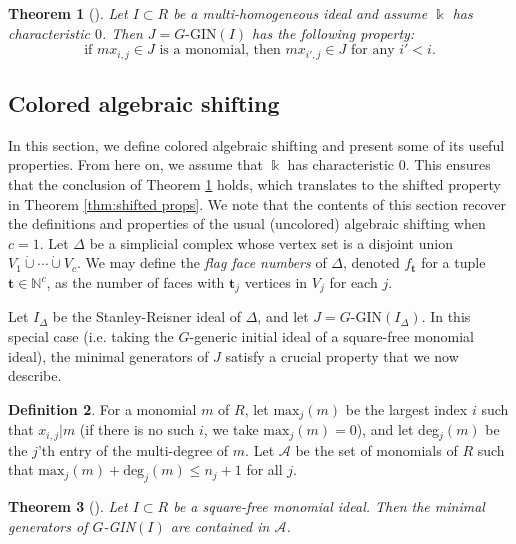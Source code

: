 \documentclass[a4paper, 10pt, reqno, english, ones]{amsart}  %
\newtheorem{theorem}{Theorem}[section]
\theoremstyle{definition}
\newtheorem{definition}[theorem]{Definition}
\theoremstyle{remark}
\begin{document}
\begin{theorem}[\cite{Babson2004Face}]\label{thm:GIN-ColorStronglyStable}
    Let $I\subset R$ be a multi-homogeneous ideal and assume $\Bbbk$ has characteristic $0$. Then $J=\textrm{$G$-GIN}(I)$ has the following property:
    \begin{equation}\label{eq:ColorStable}
    \textrm{if $mx_{i,j}\in J$ is a monomial, then $mx_{i',j}\in J$ for any $i'<i$.}
    \end{equation}
\end{theorem}

\subsection{Colored algebraic shifting}\label{sec:Alg Shifting}

In this section, we define colored algebraic shifting and present some of its useful properties. From here on, we assume that $\Bbbk$ has characteristic $0$. This ensures that the conclusion of Theorem \ref{thm:GIN-ColorStronglyStable} holds, which translates to the shifted property in Theorem \ref{thm:shifted props}. We note that the contents of this section recover the definitions and properties of the usual (uncolored) algebraic shifting when $c=1$. Let $\Delta$ be a simplicial complex whose vertex set is a disjoint union $V_1 \dot{\cup} \cdots \dot{\cup} V_c$. We may define the \textit{flag face numbers} of $\Delta$, denoted $f_{\mathbf{t}}$ for a tuple $\mathbf{t}\in \mathbb{N}^c$, as the number of faces with $\mathbf{t}_j$ vertices in $V_j$ for each $j$.



Let $I_\Delta$ be the Stanley-Reisner ideal of $\Delta$, and let $J=\textrm{$G$-GIN}(I_\Delta)$. In this special case (i.e. taking the $G$-generic initial ideal of a square-free monomial ideal), the minimal generators of $J$ satisfy a crucial property that we now describe.

\begin{definition}\label{def:A def}
    For a monomial $m$ of $R$, let $\textrm{max}_j(m)$ be the largest index $i$ such that $x_{i,j} | m$ (if there is no such $i$, we take $\textrm{max}_j(m)=0$), and let deg$_j(m)$ be the $j$'th entry of the multi-degree of $m$. Let $\mathscr{A}$ be the set of monomials of $R$ such that $\textrm{max}_j(m)+\textrm{deg}_j(m) \leq n_j+1$ for all $j$.
\end{definition}


\begin{theorem}[\cite{Murai2008Betti}]
    Let $I\subset R$ be a square-free monomial ideal. Then the minimal generators of $G$-GIN$(I)$ are contained in $\mathscr{A}$.
\end{theorem}
\end{document}
